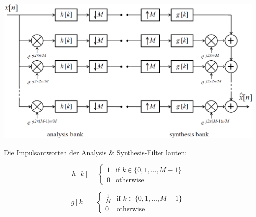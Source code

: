 \begin{center}
	\includegraphics[width=.7\textwidth]{../fig/dft_filterbank_implementation.png}
\end{center}
Die Impulsantworten der Analysis \& Synthesis-Filter lauten:\\
\begin{minipage}{.5\textwidth}
	\[ h[k] = \left\lbrace\begin{matrix}
		1	& \textrm{if } k \in \{0,1,\ldots,M-1\}\\
		0	& \textrm{otherwise}
	\end{matrix}\right. \]
\end{minipage}
\begin{minipage}{.5\textwidth}
	\[ g[k] = \left\lbrace\begin{matrix}
		\frac{1}{M}	& \textrm{if } k \in \{0,1,\ldots,M-1\}\\
		0	& \textrm{otherwise}
	\end{matrix}\right. \]
\end{minipage}
\newpage \noindent


